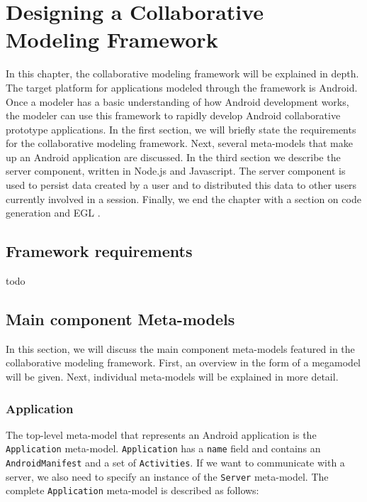 \chapter{Designing a Collaborative Modeling Framework}

In this chapter, the collaborative modeling framework will be explained in depth. The target platform for applications modeled through the framework is Android. Once a modeler has a basic understanding of how Android development works, the modeler can use this framework to rapidly develop Android collaborative prototype applications. In the first section, we will briefly state the requirements for the collaborative modeling framework. Next, several meta-models that make up an Android application are discussed. In the third section we describe the server component, written in Node.js \cite{NodeJS} and Javascript. The server component is used to persist data created by a user and to distributed this data to other users currently involved in a session. Finally, we end the chapter with a section on code generation and EGL \cite{EGL}.

\section{Framework requirements}

todo

\section{Main component Meta-models}

In this section, we will discuss the main component meta-models featured in the collaborative modeling framework. First, an overview in the form of a megamodel will be given. Next, individual meta-models will be explained in more detail.

\subsection{Application}

The top-level meta-model that represents an Android application is the \texttt{Application} meta-model. \texttt{Application} has a \texttt{name} field and contains an \texttt{AndroidManifest} and a set of \texttt{Activities}. If we want to communicate with a server, we also need to specify an instance of the \texttt{Server} meta-model. The complete \texttt{Application} meta-model is described as follows:

